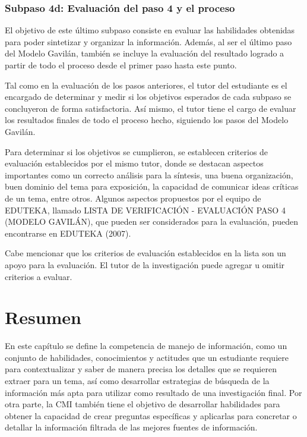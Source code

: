 
\subsubsection{Subpaso 4d: Evaluación del paso 4 y el proceso}
\label{secPaso4dCap2}

El objetivo de este último subpaso consiste en evaluar las habilidades obtenidas para poder sintetizar y organizar la información. Además, al ser el último paso del Modelo Gavilán, también se incluye la evaluación del resultado logrado a partir de todo el proceso desde el primer paso hasta este punto.

Tal como en la evaluación de los pasos anteriores, el tutor del estudiante es el encargado de determinar y medir si los objetivos esperados de cada subpaso se concluyeron de forma satisfactoria. Así mismo, el tutor tiene el cargo de evaluar los resultados finales de todo el proceso hecho, siguiendo los pasos del Modelo Gavilán.

Para determinar si los objetivos se cumplieron, se establecen criterios de evaluación establecidos por el mismo tutor, donde se destacan aspectos importantes como un correcto análisis para la síntesis, una buena organización, buen dominio del tema para exposición, la capacidad de comunicar ideas críticas de un tema, entre otros. Algunos aspectos propuestos por el equipo de EDUTEKA, llamado LISTA DE VERIFICACIÓN - EVALUACIÓN PASO 4 (MODELO GAVILÁN), que pueden ser considerados para la evaluación, pueden encontrarse en EDUTEKA (2007). 

Cabe mencionar que los criterios de evaluación establecidos en la lista son un apoyo para la evaluación. El tutor de la investigación puede agregar u omitir criterios a evaluar.


\section{Resumen}
\label{secResumenCap2}

En este capítulo se define la competencia de manejo de información, como un conjunto de habilidades, conocimientos y actitudes que un estudiante requiere para contextualizar y saber de manera precisa los detalles que se requieren extraer para un tema, así como desarrollar estrategias de búsqueda de la información más apta para utilizar como resultado de una investigación final. Por otra parte, la CMI también tiene el objetivo de desarrollar habilidades para obtener la capacidad de crear preguntas específicas y aplicarlas para concretar o detallar la información filtrada de las mejores fuentes de información.

